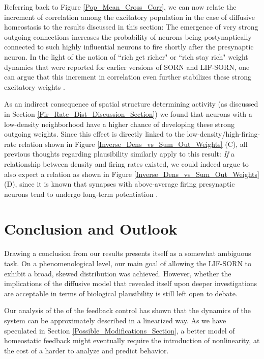 \documentclass[10pt,a4paper]{article}
\begin{document}
Referring back to Figure \ref{Pop_Mean_Cross_Corr}, we can now relate the increment of correlation among the excitatory population in the case of diffusive homeostasis to the results discussed in this section: The emergence of very strong outgoing connections increases the probability of neurons being postynaptically connected to such highly influential neurons to fire shortly after the presynaptic neuron. In the light of the notion of ``rich get richer" or ``rich stay rich" weight dynamics that were reported for earlier versions of SORN and LIF-SORN, one can argue that this increment in correlation even further stabilizes these strong excitatory weights \cite{Pengsheng_2013,SORN_Paper}.

As an indirect consequence of spatial structure determining activity (as discussed in Section \ref{Fir_Rate_Dist_Discussion_Section}) we found that neurons with a low-density neighborhood have a higher chance of developing these strong outgoing weights. Since this effect is directly linked to the low-density/high-firing-rate relation shown in Figure \ref{Inverse_Dens_vs_Sum_Out_Weights} (C), all previous thoughts regarding plausibility similarly apply to this result: \emph{If} a relationship between density and firing rates existed, we could indeed argue to also expect a relation as shown in Figure \ref{Inverse_Dens_vs_Sum_Out_Weights} (D), since it is known that synapses with above-average firing presynaptic neurons tend to undergo long-term potentiation \cite{Sjoestroem_Syn_Plasticity_2001,Feldman_STDP_2012}.

\newpage
\section{Conclusion and Outlook}\label{Conclusion_Section}
Drawing a conclusion from our results presents itself as a somewhat ambiguous task. On a phenomenological level, our main goal of allowing the LIF-SORN to exhibit a broad, skewed distribution was achieved. However, whether the implications of the diffusive model that revealed itself upon deeper investigations are acceptable in terms of biological plausibility is still left open to debate.

Our analysis of the of the feedback control has shown that the dynamics of the system can be approximately described in a linearized way. As we have speculated in Section \ref{Possible_Modifications_Section}, a better model of homeostatic feedback might eventually require the introduction of nonlinearity, at the cost of a harder to analyze and predict behavior. 
\end{document}
